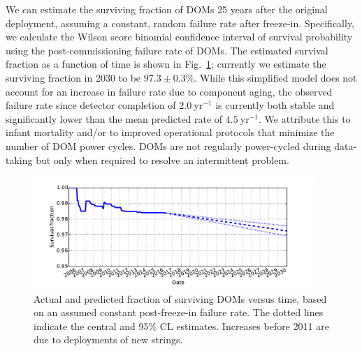 We can estimate the surviving fraction of DOMs 25 years after the original
deployment, assuming a constant, random failure rate after freeze-in.
Specifically, we calculate the Wilson score binomial confidence interval \cite{Wilson_Score} of
survival probability using the post-commissioning failure rate of DOMs.
The estimated survival fraction as a function of 
time is shown in Fig.~\ref{fig:dom_survival}; currently we estimate the
surviving fraction in 2030 to be $97.3\pm0.3\%$.  While this simplified
model does not account for an increase in failure rate due to component aging, the
observed failure rate since detector completion of $2.0~\mathrm{yr}^{-1}$ is
currently both stable and significantly lower than the mean predicted rate
of $4.5~\mathrm{yr}^{-1}$.  We attribute 
this to infant mortality and/or to improved operational protocols that
minimize the number of DOM power cycles.  DOMs are not regularly
power-cycled during data-taking but only when required to resolve an
intermittent problem.

\begin{figure}[!h]
 \centering
 \includegraphics[width=0.95\textwidth]{graphics/dom/reliability/dom_survival.pdf}
 \caption{Actual and predicted fraction of surviving DOMs versus time, based on an assumed
 constant post-freeze-in failure rate.  The dotted lines indicate the
 central and 95\% CL estimates.  Increases before 2011 are due
 to deployments of new strings.} 
 \label{fig:dom_survival}
\end{figure}

